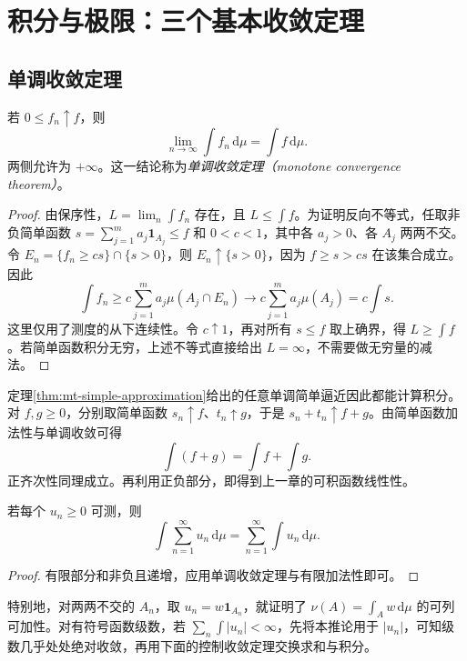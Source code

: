 \setcounter{chapter}{6} %
\chapter{积分与极限：三个基本收敛定理}
\label{chap:mt-convergence}

\section{单调收敛定理}
\begin{theorem}[单调收敛定理]
若 $0\leq f_n\uparrow f$，则
\begin{equation}
 \lim_{n\to\infty}\int f_n\,\mathrm d\mu=\int f\,\mathrm d\mu.
 \label{eq:mt-mct}
\end{equation}
两侧允许为 $+\infty$。这一结论称为\emph{单调收敛定理（monotone convergence theorem）}。
\label{thm:mt-mct}
\end{theorem}
\begin{proof}
由保序性，$L=\lim_n\int f_n$ 存在，且 $L\leq\int f$。为证明反向不等式，任取非负简单函数 $s=\sum_{j=1}^{m}a_j\mathbf1_{A_j}\leq f$ 和 $0<c<1$，其中各 $a_j>0$、各 $A_j$ 两两不交。令 $E_n=\{f_n\geq cs\}\cap\{s>0\}$，则 $E_n\uparrow\{s>0\}$，因为 $f\geq s>cs$ 在该集合成立。因此
\[
 \int f_n\geq c\sum_{j=1}^{m}a_j\mu(A_j\cap E_n)
 \longrightarrow c\sum_{j=1}^{m}a_j\mu(A_j)=c\int s.
\]
这里仅用了测度的从下连续性。令 $c\uparrow1$，再对所有 $s\leq f$ 取上确界，得 $L\geq\int f$。若简单函数积分无穷，上述不等式直接给出 $L=\infty$，不需要做无穷量的减法。
\end{proof}

定理\ref{thm:mt-simple-approximation}给出的任意单调简单逼近因此都能计算积分。对 $f,g\geq0$，分别取简单函数 $s_n\uparrow f$、$t_n\uparrow g$，于是 $s_n+t_n\uparrow f+g$。由简单函数加法性与单调收敛可得
\[
 \int(f+g)=\int f+\int g.
\]
正齐次性同理成立。再利用正负部分，即得到上一章的可积函数线性性。

\begin{corollary}[非负级数与积分交换]
若每个 $u_n\geq0$ 可测，则
\begin{equation}
 \int\sum_{n=1}^{\infty}u_n\,\mathrm d\mu
 =\sum_{n=1}^{\infty}\int u_n\,\mathrm d\mu.
 \label{eq:mt-series}
\end{equation}
\end{corollary}
\begin{proof}
有限部分和非负且递增，应用单调收敛定理与有限加法性即可。
\end{proof}
特别地，对两两不交的 $A_n$，取 $u_n=w\mathbf1_{A_n}$，就证明了 $\nu(A)=\int_Aw\,\mathrm d\mu$ 的可列可加性。对有符号函数级数，若 $\sum_n\int|u_n|<\infty$，先将本推论用于 $|u_n|$，可知级数几乎处处绝对收敛，再用下面的控制收敛定理交换求和与积分。

